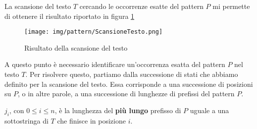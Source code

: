 \begin{esempio}
    La scansione del testo $T$ cercando le occorrenze esatte del pattern $P$ mi
    permette di ottenere il risultato riportato in figura \ref{fig:scansione}
    \begin{figure}[!ht]
        \centering
        \texttt{[image: img/pattern/ScansioneTesto.png]}
        \caption{Risultato della scansione del testo}
        \label{fig:scansione}
    \end{figure}
\end{esempio}
A questo punto è necessario identificare un'occorrenza esatta del pattern $P$ nel
testo $T$. Per risolvere questo, partiamo dalla successione di stati che abbiamo
definito per la scansione del testo. Essa corrisponde a una successione di posizioni
su $P$, o in altre parole, a una successione di lunghezze di prefissi del pattern $P$.
\begin{teorema}
    $j_i$, con $0 \leq i \leq n$, è la lunghezza del \textbf{più lungo} prefisso
    di $P$ uguale a una sottostringa di $T$ che finisce in posizione $i$.
\end{teorema}
